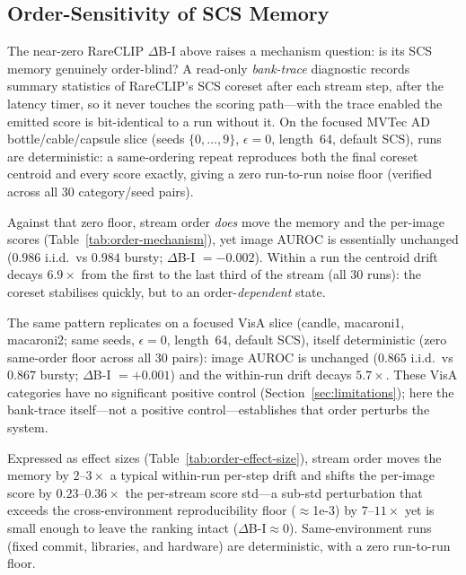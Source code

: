 \documentclass[runningheads]{llncs}
\newcommand{\tabref}[1]{Table~\ref{#1}}
\newcommand{\secref}[1]{Section~\ref{#1}}
\begin{document}
\subsection{Order-Sensitivity of SCS Memory}
\label{sec:order-mechanism}
The near-zero RareCLIP $\Delta$B-I above raises a mechanism question: is its SCS
memory genuinely order-blind? A read-only \emph{bank-trace} diagnostic records
summary statistics of RareCLIP's SCS coreset after each stream step, after the
latency timer, so it never touches the scoring path---with the trace enabled the
emitted score is bit-identical to a run without it. On the focused MVTec AD
bottle/cable/capsule slice (seeds $\{0,\dots,9\}$, $\epsilon=0$, length~64,
default SCS), runs are deterministic: a same-ordering repeat reproduces both the
final coreset centroid and every score exactly, giving a zero run-to-run noise
floor (verified across all 30 category/seed pairs).

Against that zero floor, stream order \emph{does} move the memory and the
per-image scores (\tabref{tab:order-mechanism}), yet image AUROC is essentially
unchanged ($0.986$ i.i.d.\ vs $0.984$ bursty; $\Delta$B-I $= -0.002$). Within a
run the centroid drift decays $6.9\times$ from the first to the last third of the
stream (all 30 runs): the coreset stabilises quickly, but to an
order-\emph{dependent} state.

The same pattern replicates on a focused VisA slice (candle, macaroni1,
macaroni2; same seeds, $\epsilon=0$, length~64, default SCS), itself
deterministic (zero same-order floor across all 30 pairs): image AUROC is
unchanged ($0.865$ i.i.d.\ vs $0.867$ bursty; $\Delta$B-I $= +0.001$) and the
within-run drift decays $5.7\times$. These VisA categories have no significant
positive control (\secref{sec:limitations}); here the bank-trace itself---not a
positive control---establishes that order perturbs the system.

Expressed as effect sizes (\tabref{tab:order-effect-size}), stream order moves
the memory by $2$--$3\times$ a typical within-run per-step drift and shifts the
per-image score by $0.23$--$0.36\times$ the per-stream score std---a sub-std
perturbation that exceeds the cross-environment reproducibility floor
($\approx$1e-3) by $7$--$11\times$ yet is small enough to leave the ranking
intact ($\Delta$B-I$\approx$0). Same-environment runs (fixed commit, libraries,
and hardware) are deterministic, with a zero run-to-run floor.
\end{document}
